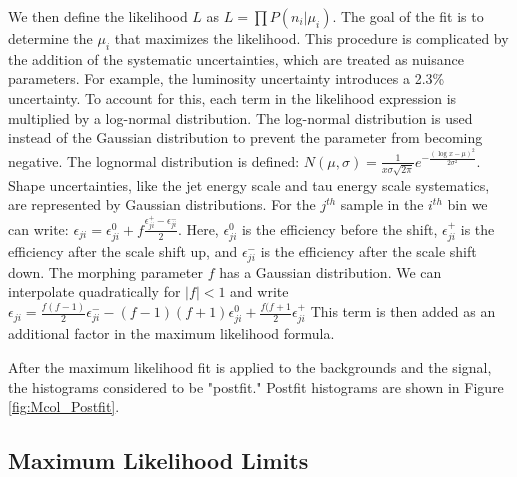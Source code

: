 \documentclass[oneside, letterpaper, oldfontcommands]{memoir}
\begin{document}
\qquad We then define the likelihood $L$ as $L =  \prod P(n_{i}|\mu_{i})$. The goal of the fit is to determine the $\mu_{i}$ that maximizes the likelihood. This procedure is complicated by the addition of the systematic uncertainties, which are treated as nuisance parameters. For example, the luminosity uncertainty\cite{EWK-10-002} introduces a  2.3\% uncertainty. To account for this, each term in the likelihood expression is multiplied by a log-normal distribution. The log-normal distribution is used instead of the Gaussian distribution to prevent the parameter from becoming negative. 
The lognormal distribution is defined: $N(\mu,\sigma) = \frac{1}{x\sigma \sqrt{2\pi}}e^{-\frac{(\log x - \mu)^{2}}{2\sigma^{2}}}$. 
Shape uncertainties, like the jet energy scale and tau energy scale systematics, are represented by Gaussian distributions. For the $j^{th}$ sample in the $i^{th}$ bin we can write: $\epsilon_{ji} = \epsilon_{ji}^{0} + f \frac{\epsilon_{ji}^{+} - \epsilon_{ji}^{-}}{2}$. Here, $\epsilon_{ji}^{0}$ is the efficiency before the shift, $\epsilon_{ji}^{+}$ is the efficiency after the scale shift up, and $\epsilon_{ji}^{-}$ is the efficiency after the scale shift down. 
The morphing parameter $f$ has a Gaussian distribution. We can interpolate quadratically for $|f|<1$ and write $\epsilon_{ji} = \frac{f (f-1)}{2} \epsilon_{ji}^{-} - (f - 1)(f + 1)\epsilon_{ji}^{0}+\frac{f(f+1}{2}\epsilon_{ji}^{+}$ This term is then added as an additional factor in the maximum likelihood formula. 

\qquad After the maximum likelihood fit is applied to the backgrounds and the signal, the histograms considered to be "postfit." Postfit histograms are shown in Figure \ref{fig:Mcol_Postfit}. %
\subsection{Maximum Likelihood Limits}
\end{document}
